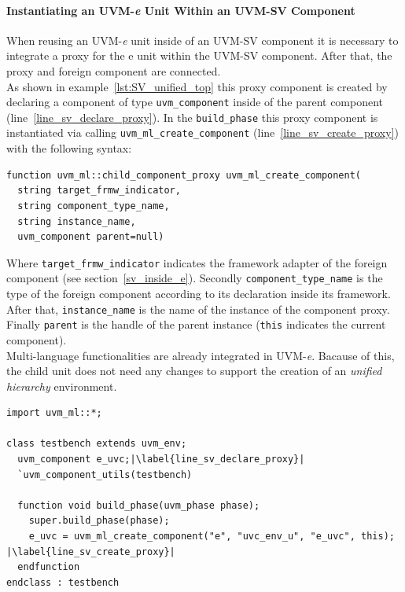 \paragraph{Instantiating an UVM-\textit{e} Unit Within an UVM-SV Component}
When reusing an UVM-\textit{e} unit inside of an UVM-SV component it is
necessary to integrate a proxy for the e unit within the UVM-SV
component. After that, the proxy and foreign component are connected.\\
As shown in example~\ref{lst:SV_unified_top} this proxy component is created by
declaring a component of type \lstinline$uvm_component$ inside of the parent
component (line~\ref{line_sv_declare_proxy}). In the \lstinline$build_phase$ this proxy component is
instantiated via calling \lstinline$uvm_ml_create_component$ (line~\ref{line_sv_create_proxy}) with the following
syntax:
\medskip
{}
\begin{lstlisting}
function uvm_ml::child_component_proxy uvm_ml_create_component(
  string target_frmw_indicator,
  string component_type_name,
  string instance_name,
  uvm_component parent=null)
\end{lstlisting} 
\medskip
Where \lstinline$target_frmw_indicator$ indicates the framework adapter of the
foreign component (see section~\ref{sv_inside_e}). Secondly
\lstinline$component_type_name$ is the type of the foreign component according
to its declaration inside its framework. After that, \lstinline$instance_name$ is the name
of the instance of the component proxy. Finally \lstinline$parent$ is the handle of
the parent instance (\lstinline$this$ indicates the current component).\\
Multi-language functionalities are already integrated in UVM-\textit{e}. Bacause of this, the child unit does not need any changes
to support the creation of an \emph{unified hierarchy} environment.
\medskip
\lstset{language=SystemVerilog, numbers = left, escapechar=|, breaklines=true}
\begin{lstlisting}[frame=htrbl, caption={SystemVerilog: instantiating an e unit}, label={lst:SV_unified_top}]
import uvm_ml::*;

class testbench extends uvm_env;
  uvm_component e_uvc;|\label{line_sv_declare_proxy}|
  `uvm_component_utils(testbench)

  function void build_phase(uvm_phase phase);
    super.build_phase(phase);
    e_uvc = uvm_ml_create_component("e", "uvc_env_u", "e_uvc", this); |\label{line_sv_create_proxy}|
  endfunction
endclass : testbench
\end{lstlisting}

